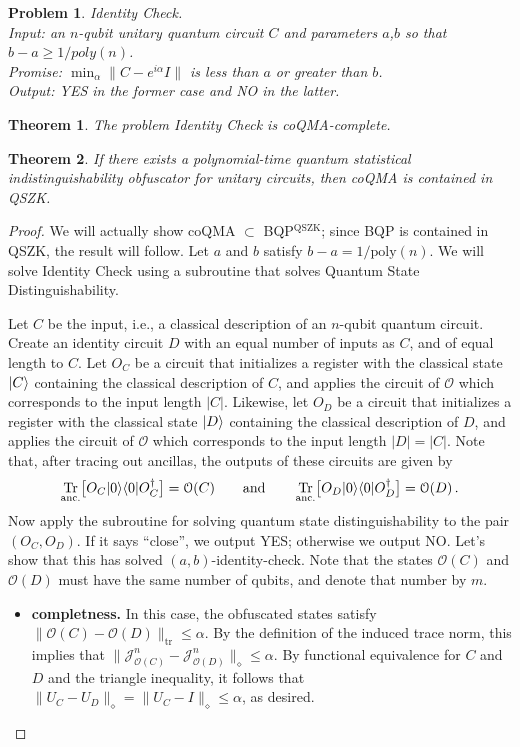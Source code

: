 \documentclass[11pt]{article}
\DeclareMathOperator{\tr}{Tr}
\numberwithin{equation}{section}
\newtheorem{theorem}{Theorem}
\newtheorem{problem}{Problem}
\begin{document}
{\begin{problem} \emph{\textsf{Identity Check}}.\\
\indent Input: an $n$-qubit unitary quantum circuit $C$ and parameters $a$,$b$ so that $b-a\geq 1/poly(n)$. \\
\indent Promise: $\min_\alpha \| C - e^{i \alpha} I \|$ is less than $a$ or greater than $b$.\\
\indent Output: YES in the former case and NO in the latter.
\end{problem}

\begin{theorem}\label{thm:ID}
\emph{\cite{JWB03}} The problem Identity Check is coQMA-complete. 
\end{theorem}

\begin{theorem}
If there exists a polynomial-time quantum statistical indistinguishability obfuscator for unitary circuits, then coQMA is contained in QSZK.
\end{theorem}
\begin{proof}
We will actually show coQMA $\subset$ BQP$^{\text{QSZK}}$; since BQP is contained in QSZK, the result will follow. Let $a$ and $b$ satisfy $b-a = 1 / \text{poly}(n)$. We will solve Identity Check using a subroutine that solves Quantum State Distinguishability. 

Let $C$ be the input, i.e., a classical description of an $n$-qubit quantum circuit. Create an identity circuit $D$ with an equal number of inputs as $C$, and of equal length to $C$. Let $O_C$ be a circuit that initializes a register with the classical state ${\left\vert{C}\right\rangle}$ containing the classical description of $C$, and applies the circuit of $\mathcal O$ which corresponds to the input length $|C|$. Likewise, let $O_D$ be a circuit that initializes a register with the classical state ${\left\vert{D}\right\rangle}$ containing the classical description of $D$, and applies the circuit of $\mathcal O$ which corresponds to the input length $|D| = |C|$. Note that, after tracing out ancillas, the outputs of these circuits are given by
$$
\tr_\text{anc.} \bigl[O_C\ket{0}\bra{0}O_C^\dagger\bigr] = \mathcal O(C)
\qquad \text{and} \qquad
\tr_\text{anc.} \bigl[O_D\ket{0}\bra{0}O_D^\dagger\bigr] = \mathcal O(D)\,.
$$
Now apply the subroutine for solving quantum state distinguishability to the pair $(O_C, O_D)$. If it says ``close'', we output YES; otherwise we output NO. Let's show that this has solved $(a, b)$-identity-check. Note that the states $\mathcal O(C)$ and $\mathcal O(D)$ must have the same number of qubits, and denote that number by $m$.
\begin{itemize}
\item \textbf{completness.} In this case, the obfuscated states satisfy $\|\mathcal O(C) - \mathcal O(D)\|_\text{tr} \leq \alpha$.  By the definition of the induced trace norm, this implies that $\|\mathcal J_{\mathcal O(C)}^n - \mathcal J_{\mathcal O(D)}^n\|_\diamond \leq \alpha$. By functional equivalence for $C$ and $D$ and the triangle inequality, it follows that $\|U_C - U_D\|_\diamond = \|U_C - I\|_\diamond \leq \alpha$, as desired.


\end{itemize}
\end{proof}}
\end{document}
